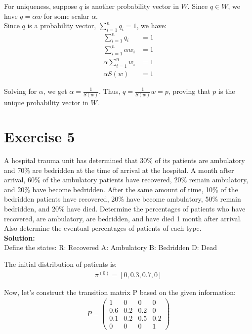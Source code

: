 \documentclass{article}
\begin{document}
For uniqueness, suppose $q$ is another probability vector in $W$. Since $q \in W$, we have $q = \alpha w$ for some scalar $\alpha$. \\

Since $q$ is a probability vector, $\sum_{i=1}^n q_i = 1$, we have:
\begin{align*}
\sum_{i=1}^n q_i &= 1 \\
\sum_{i=1}^n \alpha w_i &= 1 \\
\alpha \sum_{i=1}^n w_i &= 1 \\
\alpha S(w) &= 1
\end{align*}

Solving for $\alpha$, we get $\alpha = \frac{1}{S(w)}$. Thus, $q = \frac{1}{S(w)} w = p$, proving that $p$ is the unique probability vector in $W$.

\newpage

\section*{Exercise 5}
A hospital trauma unit has determined that 30\% of its patients are ambulatory and 70\% are bedridden at the time of arrival at the hospital. A month after arrival, 60\% of the ambulatory patients have recovered, 20\% remain ambulatory, and 20\% have become bedridden. After the same amount of time, 10\% of the bedridden patients have recovered, 20\% have become ambulatory, 50\% remain bedridden, and 20\% have died. Determine the percentages of patients who have recovered, are ambulatory, are bedridden, and have died 1 month after arrival. Also determine the eventual percentages of patients of each type. \\

\textbf{Solution:} \\

Define the states:
R: Recovered
A: Ambulatory
B: Bedridden
D: Dead

The initial distribution of patients is:
\begin{align*}
\pi^{(0)} = [0, 0.3, 0.7, 0]
\end{align*}

Now, let's construct the transition matrix P based on the given information:
\begin{align*}
P = \begin{pmatrix}
1 & 0 & 0 & 0 \\
0.6 & 0.2 & 0.2 & 0 \\
0.1 & 0.2 & 0.5 & 0.2 \\
0 & 0 & 0 & 1
\end{pmatrix}
\end{align*}
\end{document}
